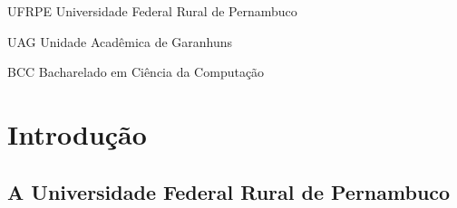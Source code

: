 \documentclass[
	12pt,				%
	openright,			%
  oneside,     %
	a4paper,			%
	english,			%
	french,				%
	spanish,			%
	brazil				%
	]{abntex2}
\begin{document}
\newpage


\frenchspacing 

\listoffigures*
\cleardoublepage

\listoftables*
\cleardoublepage

\begin{siglas}
  \item[UFRPE] Universidade Federal Rural de Pernambuco
  \item[UAG] Unidade Acadêmica de Garanhuns
  \item[BCC] Bacharelado em Ciência da Computação
\end{siglas}


\tableofcontents*
\cleardoublepage



\textual

\chapter*[Introdução]{Introdução}

\section*{A Universidade Federal Rural de Pernambuco}
\end{document}
